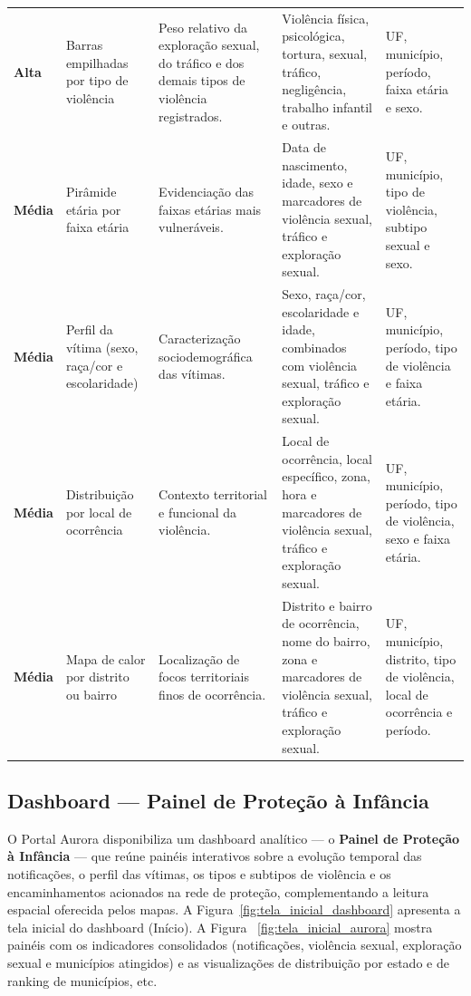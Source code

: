 \documentclass[11pt,a4paper]{article}
\begin{document}
\begin{longtable}{@{}P{1.3cm}P{2.9cm}P{3.3cm}P{4.0cm}P{3.3cm}@{}}
\textbf{Alta} & Barras empilhadas por tipo de violência & Peso relativo da exploração sexual, do tráfico e dos demais tipos de violência registrados. & Violência física, psicológica, tortura, sexual, tráfico, negligência, trabalho infantil e outras. & UF, município, período, faixa etária e sexo. \\
\textbf{Média} & Pirâmide etária por faixa etária & Evidenciação das faixas etárias mais vulneráveis. & Data de nascimento, idade, sexo e marcadores de violência sexual, tráfico e exploração sexual. & UF, município, tipo de violência, subtipo sexual e sexo. \\
\textbf{Média} & Perfil da vítima (sexo, raça/cor e escolaridade) & Caracterização sociodemográfica das vítimas. & Sexo, raça/cor, escolaridade e idade, combinados com violência sexual, tráfico e exploração sexual. & UF, município, período, tipo de violência e faixa etária. \\
\textbf{Média} & Distribuição por local de ocorrência & Contexto territorial e funcional da violência. & Local de ocorrência, local específico, zona, hora e marcadores de violência sexual, tráfico e exploração sexual. & UF, município, período, tipo de violência, sexo e faixa etária. \\
\textbf{Média} & Mapa de calor por distrito ou bairro & Localização de focos territoriais finos de ocorrência. & Distrito e bairro de ocorrência, nome do bairro, zona e marcadores de violência sexual, tráfico e exploração sexual. & UF, município, distrito, tipo de violência, local de ocorrência e período. \\
\end{longtable}
\endgroup

\subsection{Dashboard — Painel de Proteção à Infância}
\label{subsec:dashboard_resultados}

O Portal Aurora disponibiliza um dashboard analítico — o \textbf{Painel de Proteção à Infância} — que reúne painéis interativos sobre a evolução temporal das notificações, o perfil das vítimas, os tipos e subtipos de violência e os encaminhamentos acionados na rede de proteção, complementando a leitura espacial oferecida pelos mapas. A Figura~\ref{fig:tela_inicial_dashboard} apresenta a tela inicial do dashboard (Início). A Figura ~\ref{fig:tela_inicial_aurora} mostra painéis com os indicadores consolidados (notificações, violência sexual, exploração sexual e municípios atingidos) e as visualizações de distribuição por estado e de ranking de municípios, etc.
\end{document}
